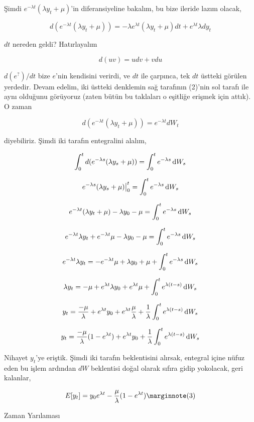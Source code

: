 \documentclass[12pt,fleqn]{article}\usepackage{../../common}
\begin{document}
Şimdi $e^{-\lambda t}(\lambda y_t + \mu)$'in diferansiyeline bakalım, bu
bize ileride lazım olacak,

$$ d(e^{-\lambda t}(\lambda y_t + \mu)) = 
-\lambda e^{\lambda t} (\lambda y_t + \mu) dt + e^{\lambda t} \lambda dy_t 
$$

$dt$ nereden geldi? Hatırlayalım 

$$ d(uv) = u dv + v du $$

$d(e^{?})/dt$ bize $e$'nin kendisini verirdi, ve $dt$ ile çarpınca, tek $dt$
üstteki görülen yerdedir. Devam edelim, iki üstteki denklemin sağ tarafının
(2)'nin sol tarafı ile aynı olduğunu görüyoruz (zaten bütün bu taklaları o
eşitliğe erişmek için attık). O zaman

$$ d(e^{-\lambda t}(\lambda y_t + \mu)) =  e^{-\lambda t} dW_t  $$

diyebiliriz. Şimdi iki tarafın entegralini alalım,

$$
\int _{0}^{t} d(e^{-\lambda s}(\lambda y_s + \mu)) =
\int_{0}^{t} e^{-\lambda s} \,\mathrm{d} W_s
$$

$$
e^{-\lambda s}(\lambda y_s + \mu) \big|_{0}^{t} =
\int_{0}^{t} e^{-\lambda s} \,\mathrm{d} W_s
$$

$$
e^{-\lambda t}(\lambda y_t + \mu) - \lambda y_0 - \mu =
\int_{0}^{t} e^{-\lambda s} \,\mathrm{d} W_s
$$

$$
e^{-\lambda t}\lambda y_t + e^{-\lambda t}\mu - \lambda y_0 - \mu =
\int_{0}^{t} e^{-\lambda s} \,\mathrm{d} W_s
$$

$$ 
e^{-\lambda t}\lambda y_t  =
- e^{-\lambda t}\mu + \lambda y_0 + \mu + \int_{0}^{t} e^{-\lambda s} \,\mathrm{d} W_s 
$$

$$ 
\lambda y_t   =
- \mu + e^{\lambda t} \lambda y_0 + e^{\lambda t}\mu + \int_{0}^{t} e^{\lambda (t-s)} \,\mathrm{d} W_s 
$$

$$ 
y_t   = \frac{-\mu}{\lambda} + e^{\lambda t} y_0 + e^{\lambda t}\frac{\mu}{\lambda} + 
\frac{1}{\lambda}\int_{0}^{t} e^{\lambda (t-s)} \,\mathrm{d} W_s 
$$

$$ 
y_t = \frac{-\mu}{\lambda} ( 1 - e^{\lambda t}) + e^{\lambda t} y_0 + 
\frac{1}{\lambda}\int_{0}^{t} e^{\lambda (t-s)} \,\mathrm{d} W_s 
$$

Nihayet $y_t$'ye eriştik. Şimdi iki tarafın beklentisini alırsak, entegral
içine nüfuz eden bu işlem ardından $dW$ beklentisi doğal olarak sıfıra
gidip yokolacak, geri kalanlar,

$$ 
E[y_t] = y_0 e^{\lambda t} - \frac{\mu}{\lambda} ( 1 - e^{\lambda t}) 
\mlabel{3}
$$

Zaman Yarılaması
\end{document}
